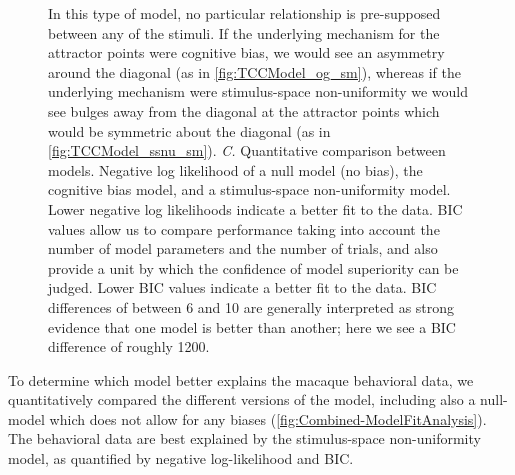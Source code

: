 \begin{figure}
{    In this type of model, no particular relationship is pre-supposed between any of the stimuli. 
    If the underlying mechanism for the attractor points were cognitive bias, we would see an asymmetry around the diagonal (as in \autoref{fig:TCCModel_og_sm}), whereas if the underlying mechanism were stimulus-space non-uniformity we would see bulges away from the diagonal at the attractor points which would be symmetric about the diagonal (as in \autoref{fig:TCCModel_ssnu_sm}).
    \emph{C.} Quantitative comparison between models. Negative log likelihood of a null model (no bias), the cognitive bias model, and a stimulus-space non-uniformity model. Lower negative log likelihoods indicate a better fit to the data. BIC values allow us to compare performance taking into account the number of model parameters and the number of trials, and also provide a unit by which the confidence of model superiority can be judged. Lower BIC values indicate a better fit to the data. BIC differences of between 6 and 10 are generally interpreted as strong evidence that one model is better than another; here we see a BIC difference of roughly 1200.
    } 
    \label{fig:TCCOutput}
\end{figure}

To determine which model better explains the macaque behavioral data, we quantitatively compared the different versions of the model, including also a null-model which does not allow for any biases (\autoref{fig:Combined-ModelFitAnalysis}). 
The behavioral data are best explained by the stimulus-space non-uniformity model, as quantified by negative log-likelihood and BIC. 

